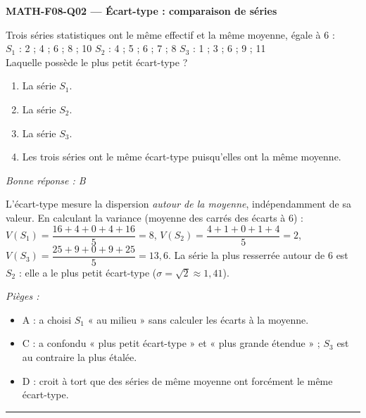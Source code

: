 \documentclass[11pt,a4paper]{article}
\begin{document}
\noindent\textbf{MATH-F08-Q02 --- Écart-type : comparaison de séries}\par
Trois séries statistiques ont le même effectif et la même moyenne, égale à $6$ :\\
$S_1$ : 2 ; 4 ; 6 ; 8 ; 10 \qquad $S_2$ : 4 ; 5 ; 6 ; 7 ; 8 \qquad $S_3$ : 1 ; 3 ; 6 ; 9 ; 11\\
Laquelle possède le plus petit écart-type ?
\begin{enumerate}[label=\Alph*)]
\item La série $S_1$.
\item La série $S_2$.
\item La série $S_3$.
\item Les trois séries ont le même écart-type puisqu'elles ont la même moyenne.
\end{enumerate}
\textit{Bonne réponse : B}\par
L'écart-type mesure la dispersion \emph{autour de la moyenne}, indépendamment de sa valeur. En calculant la variance (moyenne des carrés des écarts à $6$) : $V(S_1)=\dfrac{16+4+0+4+16}{5}=8$, $V(S_2)=\dfrac{4+1+0+1+4}{5}=2$, $V(S_3)=\dfrac{25+9+0+9+25}{5}=13{,}6$. La série la plus resserrée autour de $6$ est $S_2$ : elle a le plus petit écart-type ($\sigma=\sqrt2\approx1{,}41$).\par
\textit{Pièges :}
\begin{itemize}
\item A : a choisi $S_1$ « au milieu » sans calculer les écarts à la moyenne.
\item C : a confondu « plus petit écart-type » et « plus grande étendue » ; $S_3$ est au contraire la plus étalée.
\item D : croit à tort que des séries de même moyenne ont forcément le même écart-type.
\end{itemize}
\vspace{8pt}\hrule\vspace{8pt}
\end{document}
